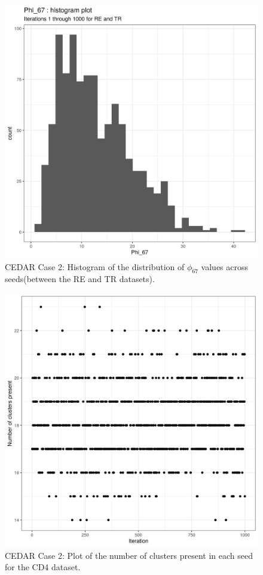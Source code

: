 \documentclass[12pt]{article} %
\begin{document}
	\begin{figure}[h]
		\centering
		\includegraphics[scale=0.75]{Images/Biology_data/Set_1000/All_datasets/Phi_histograms/Phi_67_histogram_plot.png}
		\caption{CEDAR Case 2: Histogram of the distribution of $\phi_{67}$ values across seeds(between the RE and TR datasets).}
		\label{fig:results:cedar_2:mdi_re_tr_phi_histogram}
	\end{figure}
	
	
	
	\begin{figure}[h]
		\centering
		\includegraphics[scale=0.75]{Images/Biology_data/Set_1000/All_datasets/Cluster_series_plots/CD4.png}
		\caption{CEDAR Case 2: Plot of the number of clusters present in each seed for the CD4 dataset.}
		\label{fig:results:cedar_2:mdi_cd4_number_clusters_plot}
	\end{figure}
	
\end{document}
